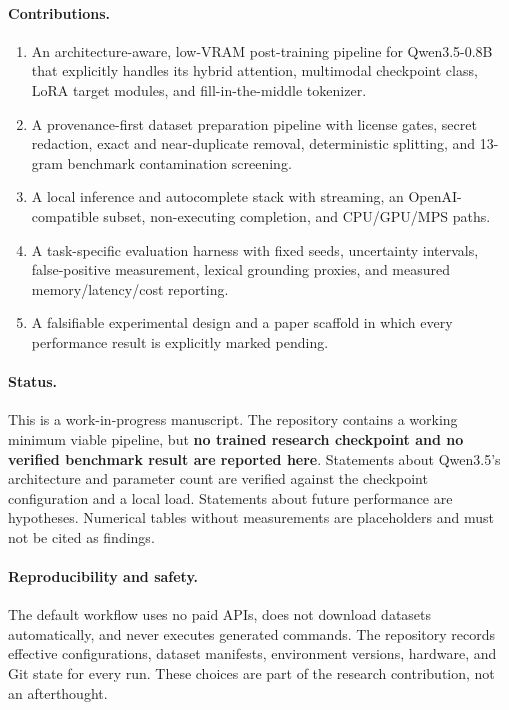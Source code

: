 \paragraph{Contributions.}
\begin{enumerate}[leftmargin=1.4em]
  \item An architecture-aware, low-VRAM post-training pipeline for Qwen3.5-0.8B
  that explicitly handles its hybrid attention, multimodal checkpoint class,
  LoRA target modules, and fill-in-the-middle tokenizer.
  \item A provenance-first dataset preparation pipeline with license gates,
  secret redaction, exact and near-duplicate removal, deterministic splitting,
  and 13-gram benchmark contamination screening.
  \item A local inference and autocomplete stack with streaming, an
  OpenAI-compatible subset, non-executing completion, and CPU/GPU/MPS paths.
  \item A task-specific evaluation harness with fixed seeds, uncertainty
  intervals, false-positive measurement, lexical grounding proxies, and
  measured memory/latency/cost reporting.
  \item A falsifiable experimental design and a paper scaffold in which every
  performance result is explicitly marked pending.
\end{enumerate}

\paragraph{Status.}
This is a work-in-progress manuscript. The repository contains a working
minimum viable pipeline, but \textbf{no trained research checkpoint and no
verified benchmark result are reported here}. Statements about Qwen3.5's
architecture and parameter count are verified against the checkpoint
configuration and a local load. Statements about future performance are
hypotheses. Numerical tables without measurements are placeholders and must not
be cited as findings.

\paragraph{Reproducibility and safety.}
The default workflow uses no paid APIs, does not download datasets
automatically, and never executes generated commands. The repository records
effective configurations, dataset manifests, environment versions, hardware,
and Git state for every run. These choices are part of the research
contribution, not an afterthought.
